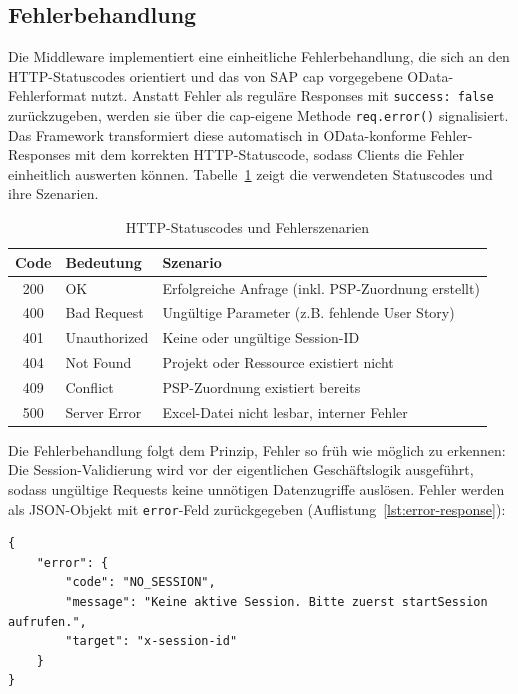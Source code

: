 \subsection{Fehlerbehandlung}

Die Middleware implementiert eine einheitliche Fehlerbehandlung, die sich an den HTTP-Statuscodes orientiert und das von SAP \gls{cap} vorgegebene OData-Fehlerformat nutzt. Anstatt Fehler als reguläre Responses mit \texttt{success: false} zurückzugeben, werden sie über die \gls{cap}-eigene Methode \texttt{req.error()} signalisiert. Das Framework transformiert diese automatisch in OData-konforme Fehler-Responses mit dem korrekten HTTP-Statuscode, sodass Clients die Fehler einheitlich auswerten können. Tabelle~\ref{tab:error-handling} zeigt die verwendeten Statuscodes und ihre Szenarien.

\begin{table}[H]
\centering
\caption{HTTP-Statuscodes und Fehlerszenarien}
\label{tab:error-handling}
\begin{tabularx}{\textwidth}{cl>{\raggedright\arraybackslash}X}
\toprule
\textbf{Code} & \textbf{Bedeutung} & \textbf{Szenario} \\
\midrule
200 & OK & Erfolgreiche Anfrage (inkl. PSP-Zuordnung erstellt) \\
400 & Bad Request & Ungültige Parameter (z.B. fehlende User Story) \\
401 & Unauthorized & Keine oder ungültige Session-ID \\
404 & Not Found & Projekt oder Ressource existiert nicht \\
409 & Conflict & PSP-Zuordnung existiert bereits \\
500 & Server Error & Excel-Datei nicht lesbar, interner Fehler \\
\bottomrule
\end{tabularx}
\end{table}

Die Fehlerbehandlung folgt dem Prinzip, Fehler so früh wie möglich zu erkennen: Die Session-Validierung wird vor der eigentlichen Geschäftslogik ausgeführt, sodass ungültige Requests keine unnötigen Datenzugriffe auslösen. Fehler werden als JSON-Objekt mit \texttt{error}-Feld zurückgegeben (Auflistung~\ref{lst:error-response}):

\begin{lstlisting}[caption={Fehler-Response Format}, label={lst:error-response}]
{
    "error": {
        "code": "NO_SESSION",
        "message": "Keine aktive Session. Bitte zuerst startSession aufrufen.",
        "target": "x-session-id"
    }
}
\end{lstlisting}

